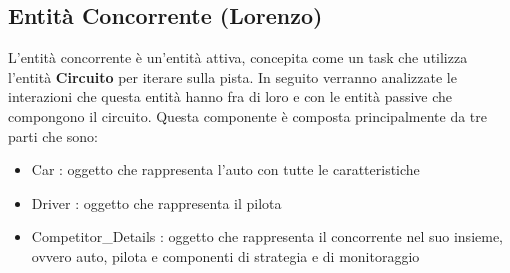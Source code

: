 \subsection{Entit\`{a} Concorrente (Lorenzo)}
L'entità concorrente è un'entità attiva, concepita
come un task che utilizza l'entità \textbf{Circuito} per iterare sulla pista. In
seguito
verranno analizzate le interazioni che questa entità hanno fra di loro e con le
entità passive che compongono il circuito.
Questa componente è composta principalmente da tre parti che sono:
\begin{itemize}
\item Car : oggetto che rappresenta l'auto con tutte le caratteristiche
\item Driver : oggetto che rappresenta il pilota
\item Competitor\_Details : oggetto che rappresenta il concorrente nel suo
insieme, ovvero auto, pilota e componenti di strategia e di monitoraggio
\end{itemize}
